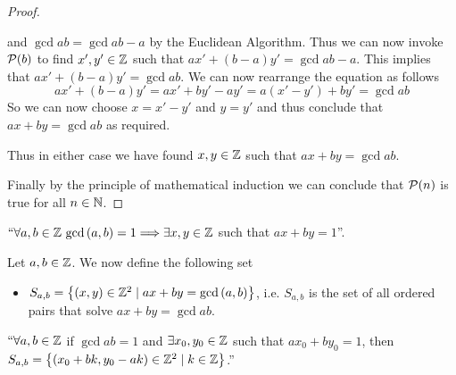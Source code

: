 \begin{proof}
\begin{itemize}
\begin{itemize}
                            and $\gcd{a}{b} = \gcd{a}{b - a}$ by the Euclidean Algorithm. Thus we can now invoke
                            $\mathcal{P}(b)$ to find $x', y' \in \mathbb{Z}$ such that 
                            $ax' + (b - a)y' = \gcd{a}{b - a}$.
                            This implies that $ax' + (b - a)y' = \gcd{a}{b}$. We can now rearrange the equation
                            as follows
                            \[
                                ax' + (b - a)y' = ax' + by' - ay' = a(x' - y') + by' = \gcd{a}{b}
                            \]
                            So we can now choose $x = x' - y'$ and $y = y'$ and thus conclude that 
                            $ax + by = \gcd{a}{b}$ as required.
                    \end{itemize}
                    Thus in either case we have found $x, y \in \mathbb{Z}$ such that $ax + by = \gcd{a}{b}$.
            \end{itemize}
            Finally by the principle of mathematical induction we can conclude that $\mathcal{P}(n)$ is
            true for all $n \in \mathbb{N}$. \QED
        \end{proof}
        \begin{corollary}
            $``\forall a, b \in \mathbb{Z} \ \mathrm{gcd}\left(a, b\right) = 1 \Longrightarrow \exists x, y \in \mathbb{Z}$ such
            that $ax + by = 1$''.
            \label{diophantine inverse}
        \end{corollary}
        \begin{definition}
            Let $a, b \in \mathbb{Z}$. We now define the following set
            \begin{itemize}
                \item
                    $S_{a, b} = \left\{(x, y) \in \mathbb{Z}^2 \mid ax + by = \mathrm{gcd}\left(a, b\right)\right\}$, i.e. $S_{a, b}$ is
                    the set of all ordered pairs that solve $ax + by = \gcd{a}{b}$.
            \end{itemize}
        \end{definition}
        \begin{lemma}
            $``\forall a, b \in \mathbb{Z}$ if $\gcd{a}{b} = 1$ and $\exists x_0, y_0 \in \mathbb{Z}$
            such that $ax_0 + by_0 = 1$, then 
            $S_{a, b} = \left\{(x_0 + bk, y_0 - ak) \in \mathbb{Z}^2 \mid k \in \mathbb{Z}\right\}$.''
            \label{Linear Diophantine Equations All Solutions Lemma}
        \end{lemma}
